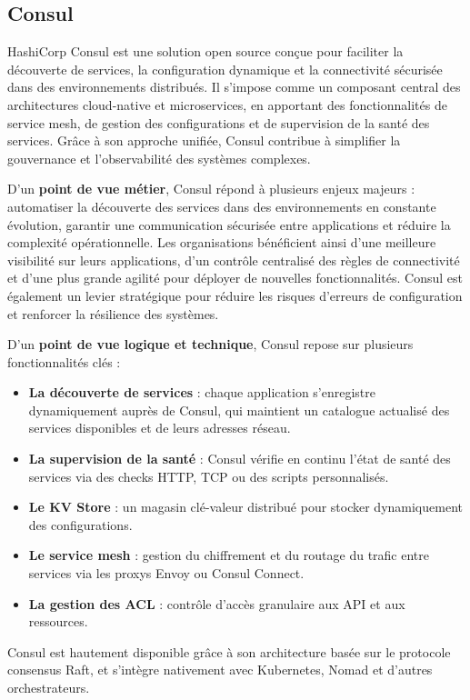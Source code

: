\subsection{Consul}

HashiCorp Consul est une solution open source conçue pour faciliter la découverte de services, la configuration dynamique et la connectivité sécurisée dans des environnements distribués. Il s’impose comme un composant central des architectures cloud-native et microservices, en apportant des fonctionnalités de service mesh, de gestion des configurations et de supervision de la santé des services. Grâce à son approche unifiée, Consul contribue à simplifier la gouvernance et l’observabilité des systèmes complexes.

D’un \textbf{point de vue métier}, Consul répond à plusieurs enjeux majeurs  : automatiser la découverte des services dans des environnements en constante évolution, garantir une communication sécurisée entre applications et réduire la complexité opérationnelle. Les organisations bénéficient ainsi d’une meilleure visibilité sur leurs applications, d’un contrôle centralisé des règles de connectivité et d’une plus grande agilité pour déployer de nouvelles fonctionnalités. Consul est également un levier stratégique pour réduire les risques d’erreurs de configuration et renforcer la résilience des systèmes.

D’un \textbf{point de vue logique et technique}, Consul repose sur plusieurs fonctionnalités clés  :
\begin{itemize}
	\item \textbf{La découverte de services}  : chaque application s’enregistre dynamiquement auprès de Consul, qui maintient un catalogue actualisé des services disponibles et de leurs adresses réseau.
	\item \textbf{La supervision de la santé}  : Consul vérifie en continu l’état de santé des services via des checks HTTP, TCP ou des scripts personnalisés.
	\item \textbf{Le KV Store}  : un magasin clé-valeur distribué pour stocker dynamiquement des configurations.
	\item \textbf{Le service mesh}  : gestion du chiffrement et du routage du trafic entre services via les proxys Envoy ou Consul Connect.
	\item \textbf{La gestion des ACL}  : contrôle d’accès granulaire aux API et aux ressources.
\end{itemize}

Consul est hautement disponible grâce à son architecture basée sur le protocole consensus Raft, et s’intègre nativement avec Kubernetes, Nomad et d’autres orchestrateurs.

